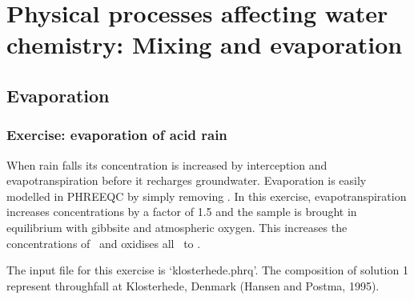 \chapter{Physical processes affecting water chemistry: Mixing and evaporation}
\def\shorttitle{Mixing and evaporation} %

\section{Evaporation}

\subsection{Exercise: evaporation of acid rain}
When rain falls its concentration is increased by interception and evapotranspiration before it recharges groundwater. Evaporation is easily modelled in PHREEQC by simply removing \wa. In this exercise, evapotranspiration increases concentrations by a factor of 1.5 and the sample is brought in equilibrium with gibbsite and atmospheric oxygen. This increases the concentrations of \al\ and oxidises all \nh\ to \no.

The input file for this exercise is `klosterhede.phrq'. The composition of solution 1 represent throughfall at Klosterhede, Denmark (Hansen and Postma, 1995).

